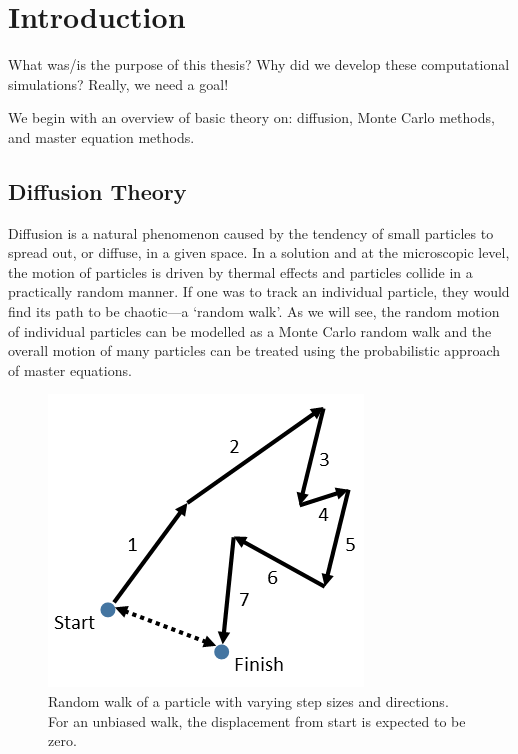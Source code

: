 \chapter{Introduction}
\label{chapter:introduction}

	What was/is the purpose of this thesis? Why did we develop these computational simulations? Really, we need a goal!

%
%

We begin with an overview of basic theory on: diffusion, Monte Carlo methods, and master equation methods.
	
\section{Diffusion Theory}
\label{sec:intro-diffusion}
	Diffusion is a natural phenomenon caused by the tendency of small particles to spread out, or diffuse, in a given space. In a solution and at the microscopic level, the motion of particles is driven by thermal effects and particles collide in a practically random manner. If one was to track an individual particle, they would find its path to be chaotic---a `random walk'. As we will see, the random motion of individual particles can be modelled as a Monte Carlo random walk and the overall motion of many particles can be treated using the probabilistic approach of master equations.
	
	\begin{figure}[h]
		\centering
		\includegraphics[width=0.5\linewidth]{../images/random-walk}
		\caption{Random walk of a particle with varying step sizes and directions. For an unbiased walk, the displacement from start is expected to be zero.}
		\label{fig:random-walk}
	\end{figure}
	
